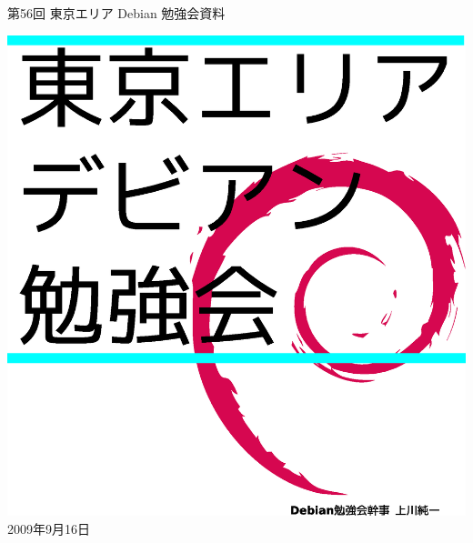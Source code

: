 \documentclass[mingoth,a4paper]{jsarticle}
\newcommand{\debmtgyear}{2009}
\newcommand{\debmtgmonth}{9}
\newcommand{\debmtgdate}{16}
\newcommand{\debmtgnumber}{56}
\begin{document}
\begin{titlepage}
\thispagestyle{empty}


\vspace*{-2cm}
第\debmtgnumber{}回 東京エリア Debian 勉強会資料

\hspace*{-2.4cm}
\includegraphics[width=210mm]{image200801/2008title.eps}\\
\hfill{}\debmtgyear{}年\debmtgmonth{}月\debmtgdate{}日

\end{titlepage}

\end{document}
